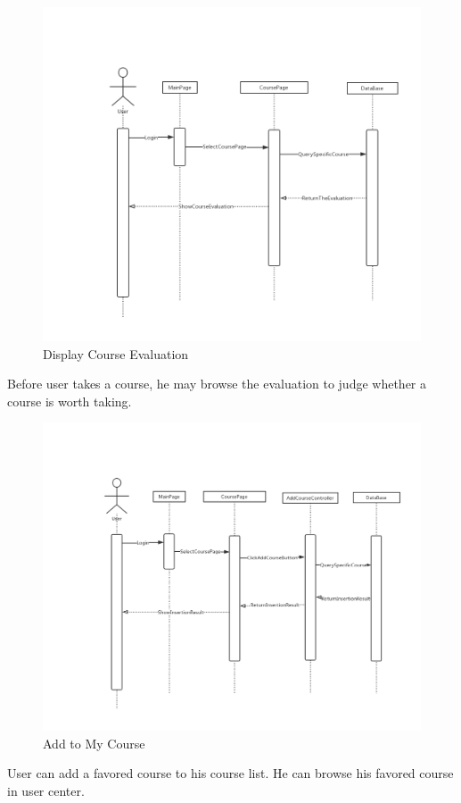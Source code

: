 \documentclass[16pt]{scrreprt}
\begin{document}
\begin{figure}[H]
    \includegraphics[width=\linewidth]{./FuncPhoto/9.png}   
    \caption{Display Course Evaluation}
\end{figure}
Before user takes a course, he may browse the evaluation to judge whether a course is worth taking.

\begin{figure}[H]
    \includegraphics[width=\linewidth]{./FuncPhoto/10.png}   
    \caption{Add to My Course}
\end{figure}
User can add a favored course to his course list. He can browse his favored course in user center.
\end{document}
